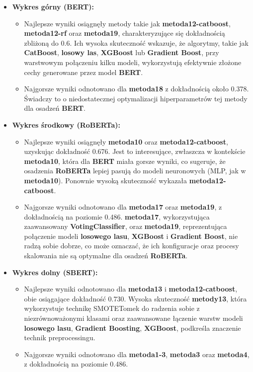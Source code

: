\begin{itemize}
	\item \textbf{Wykres górny (BERT):}
	      \begin{itemize}
		      \item Najlepsze wyniki osiągnęły metody takie jak \textbf{metoda12-catboost}, \textbf{metoda12-rf} oraz \textbf{metoda19}, charakteryzujące się dokładnością zbliżoną do 0.6. Ich wysoka skuteczność wskazuje, że algorytmy, takie jak \textbf{CatBoost}, \textbf{losowy las}, \textbf{XGBoost} lub \textbf{Gradient Boost}, przy warstwowym połączeniu kilku modeli, wykorzystują efektywnie złożone cechy generowane przez model \textbf{BERT}.
		      \item Najgorsze wyniki odnotowano dla \textbf{metoda18} z dokładnością około 0.378. Świadczy to o niedostatecznej optymalizacji hiperparametrów tej metody dla osadzeń \textbf{BERT}.
	      \end{itemize}

	\item \textbf{Wykres środkowy (RoBERTa):}
	      \begin{itemize}
		      \item Najlepsze wyniki osiągnęły \textbf{metoda10} oraz \textbf{metoda12-catboost}, uzyskując dokładność 0.676. Jest to interesujące, zwłaszcza w kontekście \textbf{metoda10}, która dla \textbf{BERT} miała gorsze wyniki, co sugeruje, że osadzenia \textbf{RoBERTa} lepiej pasują do modeli neuronowych (MLP, jak w \textbf{metoda10}). Ponownie wysoką skuteczność wykazała \textbf{metoda12-catboost}.
		      \item Najgorsze wyniki odnotowano dla \textbf{metoda17} oraz \textbf{metoda19}, z dokładnością na poziomie 0.486. \textbf{metoda17}, wykorzystująca zaawansowany \textbf{VotingClassifier}, oraz \textbf{metoda19}, reprezentująca połączenie modeli \textbf{losowego lasu}, \textbf{XGBoost} i \textbf{Gradient Boost}, nie radzą sobie dobrze, co może oznaczać, że ich konfiguracje oraz procesy skalowania nie są optymalne dla osadzeń \textbf{RoBERTa}.
	      \end{itemize}

	\item \textbf{Wykres dolny (SBERT):}
	      \begin{itemize}
		      \item Najlepsze wyniki odnotowano dla \textbf{metoda13} i \textbf{metoda12-catboost}, obie osiągające dokładność 0.730. Wysoka skuteczność \textbf{metody13}, która wykorzystuje technikę SMOTETomek do radzenia sobie z niezrównoważonymi klasami oraz zaawansowane łączenie warstw modeli \textbf{losowego lasu}, \textbf{Gradient Boosting}, \textbf{XGBoost}, podkreśla znaczenie technik preprocessingu.
		      \item Najgorsze wyniki odnotowano dla \textbf{metoda1-3}, \textbf{metoda3} oraz \textbf{metoda4}, z dokładnością na poziomie 0.486.
	      \end{itemize}
\end{itemize}
